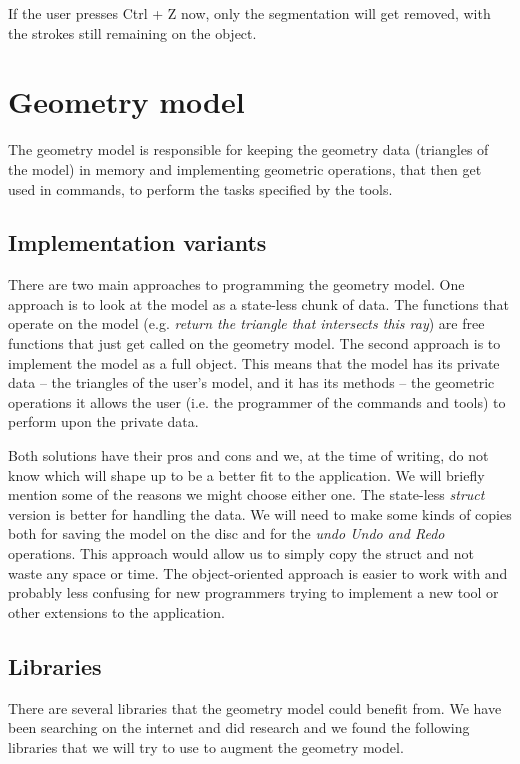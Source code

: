 If the user presses Ctrl + Z now, only the segmentation will get removed, with the strokes still remaining on the object.

\section{Geometry model} \label{geometrymodel}

The geometry model is responsible for keeping the geometry data (triangles of the model) in memory and implementing geometric operations, that then get used in commands, to perform the tasks specified by the tools.

\subsection{Implementation variants}

There are two main approaches to programming the geometry model. One approach is to look at the model as a state-less chunk of data. The functions that operate on the model (e.g. \textit{return the triangle that intersects this ray}) are free functions that just get called on the geometry model. The second approach is to implement the model as a full object. This means that the model has its private data -- the triangles of the user's model, and it has its methods -- the geometric operations it allows the user (i.e. the programmer of the commands and tools) to perform upon the private data.

Both solutions have their pros and cons and we, at the time of writing, do not know which will shape up to be a better fit to the application. We will briefly mention some of the reasons we might choose either one. The state-less \textit{struct} version is better for handling the data. We will need to make some kinds of copies both for saving the model on the disc and for the \textit{undo Undo and Redo} operations. This approach would allow us to simply copy the struct and not waste any space or time. The object-oriented approach is easier to work with and probably less confusing for new programmers trying to implement a new tool or other extensions to the application.

\subsection{Libraries}

There are several libraries that the geometry model could benefit from. We have been searching on the internet and did research and we found the following libraries that we will try to use to augment the geometry model.

